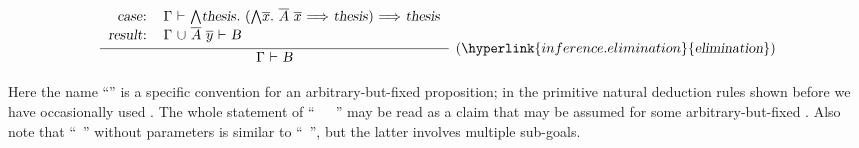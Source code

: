 \begin{isabellebody}
\begin{isamarkuptext}
  \[
  \infer[(\hyperlink{inference.elimination}{\mbox{\isa{elimination}}})]{\isa{{\isachardoublequote}{\isasymGamma}\ {\isasymturnstile}\ B{\isachardoublequote}}}{
    \begin{tabular}{rl}
    \isa{{\isachardoublequote}case{\isacharcolon}{\isachardoublequote}} &
    \isa{{\isachardoublequote}{\isasymGamma}\ {\isasymturnstile}\ {\isasymAnd}thesis{\isachardot}\ {\isacharparenleft}{\isasymAnd}\isactrlvec x{\isachardot}\ \isactrlvec A\ \isactrlvec x\ {\isasymLongrightarrow}\ thesis{\isacharparenright}\ {\isasymLongrightarrow}\ thesis{\isachardoublequote}} \\[0.2ex]
    \isa{{\isachardoublequote}result{\isacharcolon}{\isachardoublequote}} &
    \isa{{\isachardoublequote}{\isasymGamma}\ {\isasymunion}\ \isactrlvec A\ \isactrlvec y\ {\isasymturnstile}\ B{\isachardoublequote}} \\[0.2ex]
    \end{tabular}}
  \]

  \noindent Here the name ``'' is a specific convention
  for an arbitrary-but-fixed proposition; in the primitive natural
  deduction rules shown before we have occasionally used .
  The whole statement of ``\hyperlink{command.obtain}{\mbox{}}~~\hyperlink{keyword.where}{\mbox{}}~'' may be read as a claim that 
  may be assumed for some arbitrary-but-fixed .  Also note
  that ``\hyperlink{command.obtain}{\mbox{}}~'' without parameters
  is similar to ``\hyperlink{command.have}{\mbox{}}~'', but the
  latter involves multiple sub-goals.


\end{isamarkuptext}
\end{isabellebody}
